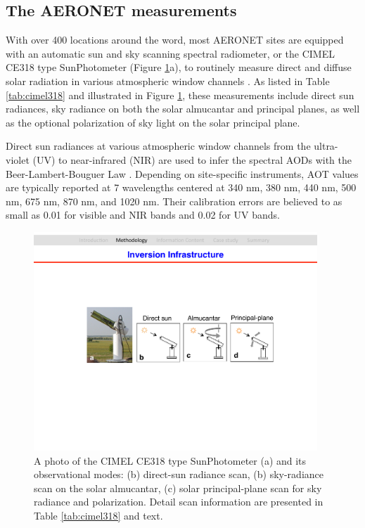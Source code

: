 \subsection{The AERONET measurements} \label{subsec:cimel318}

With over 400 locations around the word, most AERONET sites are equipped with
an automatic sun and sky scanning spectral radiometer, or the CIMEL CE318 type
SunPhotometer (Figure \ref{fig:cimel318}a), to routinely measure direct and 
diffuse solar radiation in various atmospheric window channels \citep{Holben98}. 
As listed in Table \ref{tab:cimel318} and illustrated in Figure 
\ref{fig:cimel318}, these measurements include direct sun radiances, sky 
radiance on both the solar almucantar and principal planes, as well as the 
optional polarization of sky light on the solar principal plane.

Direct sun radiances at various atmospheric window channels from the
ultra-violet (UV) to near-infrared (NIR) are used to infer the spectral AODs with the
Beer-Lambert-Bouguer Law \citep{Holben98,Smirnov00}. Depending on site-specific
instruments, AOT values are typically reported at 7 wavelengths centered at 340
nm, 380 nm, 440 nm, 500 nm, 675 nm, 870 nm, and 1020 nm. Their calibration
errors are believed to as small as 0.01 for visible and NIR bands and 0.02 for
UV bands.

\begin{figure}[t]
  \centering
  \includegraphics[width={0.95\textwidth}]{figures/cimel318.pdf}
  \caption{A photo of the CIMEL CE318 type SunPhotometer (a) and its 
observational modes: (b) direct-sun radiance scan, (b) sky-radiance scan
on the solar almucantar, (c) solar principal-plane scan for sky radiance
and polarization. Detail scan information are presented in Table
\ref{tab:cimel318} and text.}
  \label{fig:cimel318}
\end{figure}

